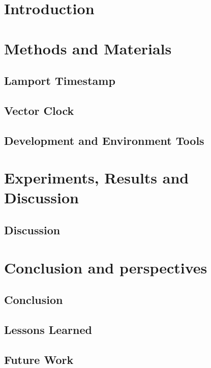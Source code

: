 \documentclass{article}
\begin{document}

\tableofcontents
\section{Introduction}

\section{Methods and Materials}
  \subsection{Lamport Timestamp}

  \subsection{Vector Clock}

  \subsection{Development and Environment Tools}

\section{Experiments, Results and Discussion}
  

  \subsection{Discussion}

\section{Conclusion and perspectives}
    \subsection{Conclusion}
    
    \subsection{Lessons Learned}

    \subsection{Future Work}

\newpage
    \nocite{*}
\end{document}
